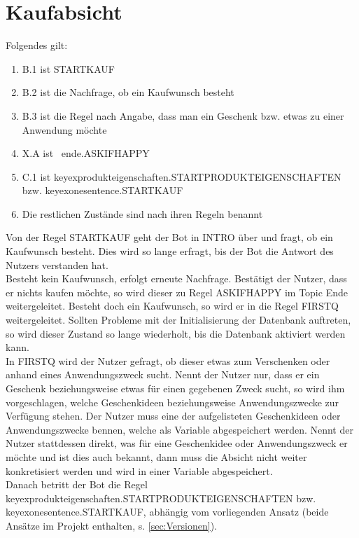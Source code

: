 \section{Kaufabsicht}
\label{sec:Kaufabsicht}

Folgendes gilt:

\begin{enumerate}
\item{B.1 ist STARTKAUF}
\item{B.2 ist die Nachfrage, ob ein Kaufwunsch besteht}
\item{B.3 ist die Regel nach Angabe, dass man ein Geschenk bzw. etwas zu einer Anwendung möchte}
\item{X.A ist ~ende.ASKIFHAPPY}
\item{C.1 ist keyexprodukteigenschaften.STARTPRODUKTEIGENSCHAFTEN bzw. keyexonesentence.STARTKAUF}
\item{Die restlichen Zustände sind nach ihren Regeln benannt}
\end{enumerate}

Von der Regel STARTKAUF geht der Bot in INTRO über und fragt, ob ein Kaufwunsch besteht. Dies wird so lange erfragt, bis der Bot die Antwort des Nutzers verstanden hat.\\
Besteht kein Kaufwunsch, erfolgt erneute Nachfrage. Bestätigt der Nutzer, dass er nichts kaufen möchte, so wird dieser zu Regel ASKIFHAPPY im Topic Ende weitergeleitet. Besteht doch ein Kaufwunsch, so wird er in die Regel FIRSTQ weitergeleitet. Sollten Probleme mit der Initialisierung der Datenbank auftreten, so wird dieser Zustand so lange wiederholt, bis die Datenbank aktiviert werden kann. \\
In FIRSTQ wird der Nutzer gefragt, ob dieser etwas zum Verschenken oder anhand eines Anwendungszweck sucht. Nennt der Nutzer nur, dass er ein Geschenk beziehungsweise etwas für einen gegebenen Zweck sucht, so wird ihm vorgeschlagen, welche Geschenkideen beziehungsweise Anwendungszwecke zur Verfügung stehen. Der Nutzer muss eine der aufgelisteten Geschenkideen oder Anwendungszwecke bennen, welche als Variable abgespeichert werden. Nennt der Nutzer stattdessen direkt, was für eine Geschenkidee oder Anwendungszweck er möchte und ist dies auch bekannt, dann muss die Absicht nicht weiter konkretisiert werden und wird in einer Variable abgespeichert. \\
Danach betritt der Bot die Regel keyexprodukteigenschaften.STARTPRODUKTEIGENSCHAFTEN bzw. keyexonesentence.STARTKAUF, abhängig vom vorliegenden Ansatz (beide Ansätze im Projekt enthalten, s. \ref{sec:Versionen}). 

